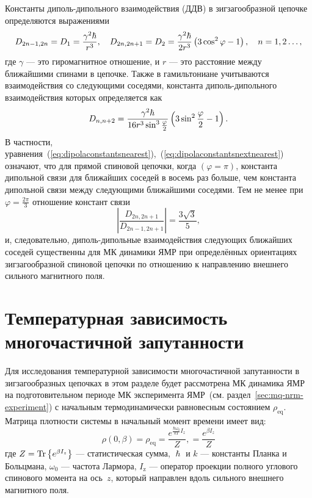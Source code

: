 Константы диполь-дипольного взаимодействия (ДДВ)
в зигзагообразной цепочке определяются выражениями~\cite{Abragam1982}
%
\begin{equation}\label{eq:dipolaconstantsnearest}
  D_{2n-1, 2n} = D_1 =\dfrac{\gamma^2\hbar }{r^3},
  \quad
  D_{2n, 2n+1} = D_2=\dfrac{\gamma^2\hbar }{2r^3}\left( 3\cos^2 \varphi -1 \right),
  \quad
  n=1,2\dots,
\end{equation}
где $\gamma$ --- это гиромагнитное отношение,
и $r$ --- это расстояние между ближайшими спинами в цепочке.
Также в гамильтониане учитываются взаимодействия со следующими соседями,
константа диполь-дипольного взаимодействия которых определяется как~\cite{Abragam1982}
%
\begin{equation}\label{eq:dipolaconstantsnextnearest}
  D_{n, n+2}=\dfrac{\gamma^2\hbar }{16r^3 \sin^3 \frac{\varphi}{2}}\left( 3\sin^2 \frac{\varphi}{2} -1 \right).
\end{equation}
%
В частности, уравнения~(\ref{eq:dipolaconstantsnearest}),~(\ref{eq:dipolaconstantsnextnearest}) означают,
что для прямой спиновой цепочки, когда  $(\varphi=\pi)$,
константа дипольной связи для ближайших соседей в восемь раз больше,
чем константа дипольной связи между следующими ближайшими соседями.
Тем не менее при $\varphi=\frac{2\pi}{3}$ отношение констант связи
\begin{equation}
  \left|\dfrac{D_{2n, 2n+1}}{D_{2n-1, 2n+1}}\right| = \dfrac{3\sqrt{3}}{5},
\end{equation}
и, следовательно,
диполь-дипольные взаимодействия следующих ближайших соседей
существенны для МК динамики ЯМР при определённых ориентациях зигзагообразной спиновой цепочки
по отношению к направлению внешнего сильного магнитного поля.


\section{Температурная зависимость многочастичной запутанности}
Для исследования температурной зависимости многочастичной запутанности
в зигзагообразных цепочках
в этом разделе будет рассмотрена МК динамика ЯМР
на подготовительном периоде МК эксперимента ЯМР~(см. раздел~\ref{sec:mq-nrm-experiment})
с начальным термодинамически равновесным состоянием $\rho_\mathrm{eq}$.
Матрица плотности системы в начальный момент времени имеет вид:
\begin{equation}
  \rho(0, \beta)
  = \rho_\mathrm{eq}
  = \dfrac{e^{\frac{\hbar\omega_{0}}{kT} I_z}}{Z},
  = \dfrac{e^{\beta I_z}}{Z}
\end{equation}
где $Z = \mathrm{Tr} \left\{ e^{\beta I_z} \right\}$ --- статистическая сумма,
$\hslash$ и $k$ --- константы Планка и Больцмана,
$\omega_{0}$ --- частота Лармора,
$I_\mathrm{z}$ ---  оператор проекции полного углового спинового момента  на ось~$z$,
который направлен вдоль сильного внешнего магнитного поля.


